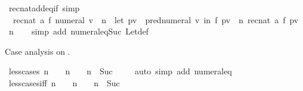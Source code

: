 \begin{isabellebody}
\ rec{\isacharunderscore}{\kern0pt}nat{\isacharunderscore}{\kern0pt}add{\isacharunderscore}{\kern0pt}eq{\isacharunderscore}{\kern0pt}if\ {\isacharbrackleft}{\kern0pt}simp{\isacharbrackright}{\kern0pt}{\isacharcolon}{\kern0pt}\isanewline
\ \ {\isachardoublequoteopen}rec{\isacharunderscore}{\kern0pt}nat\ a\ f\ {\isacharparenleft}{\kern0pt}numeral\ v\ {\isacharplus}{\kern0pt}\ n{\isacharparenright}{\kern0pt}\ {\isacharequal}{\kern0pt}\ {\isacharparenleft}{\kern0pt}let\ pv\ {\isacharequal}{\kern0pt}\ pred{\isacharunderscore}{\kern0pt}numeral\ v\ in\ f\ {\isacharparenleft}{\kern0pt}pv\ {\isacharplus}{\kern0pt}\ n{\isacharparenright}{\kern0pt}\ {\isacharparenleft}{\kern0pt}rec{\isacharunderscore}{\kern0pt}nat\ a\ f\ {\isacharparenleft}{\kern0pt}pv\ {\isacharplus}{\kern0pt}\ n{\isacharparenright}{\kern0pt}{\isacharparenright}{\kern0pt}{\isacharparenright}{\kern0pt}{\isachardoublequoteclose}\isanewline
%
\isadelimproof
\ \ %
\endisadelimproof
%
\isatagproof
{}\isamarkupfalse%
\ {\isacharparenleft}{\kern0pt}simp\ add{\isacharcolon}{\kern0pt}\ numeral{\isacharunderscore}{\kern0pt}eq{\isacharunderscore}{\kern0pt}Suc\ Let{\isacharunderscore}{\kern0pt}def{\isacharparenright}{\kern0pt}%
\endisatagproof
{\isafoldproof}%
%
\isadelimproof
%
\endisadelimproof
%
\begin{isamarkuptext}%
Case analysis on .%
\end{isamarkuptext}\isamarkuptrue%
\isamarkupfalse%
\ less{\isacharunderscore}{\kern0pt}{}{\isacharunderscore}{\kern0pt}cases{\isacharcolon}{\kern0pt}\ {\isachardoublequoteopen}n\ {\isacharless}{\kern0pt}\ {}\ {\isasymLongrightarrow}\ n\ {\isacharequal}{\kern0pt}\ {}\ {\isasymor}\ n\ {\isacharequal}{\kern0pt}\ Suc\ {}{\isachardoublequoteclose}\isanewline
%
\isadelimproof
\ \ %
\endisadelimproof
%
\isatagproof
{}\isamarkupfalse%
\ {\isacharparenleft}{\kern0pt}auto\ simp\ add{\isacharcolon}{\kern0pt}\ numeral{\isacharunderscore}{\kern0pt}{}{\isacharunderscore}{\kern0pt}eq{\isacharunderscore}{\kern0pt}{}{\isacharparenright}{\kern0pt}%
\endisatagproof
{\isafoldproof}%
%
\isadelimproof
\isanewline
%
\endisadelimproof
\isanewline
{}\isamarkupfalse%
\ less{\isacharunderscore}{\kern0pt}{}{\isacharunderscore}{\kern0pt}cases{\isacharunderscore}{\kern0pt}iff{\isacharcolon}{\kern0pt}\ {\isachardoublequoteopen}n\ {\isacharless}{\kern0pt}\ {}\ {\isasymlongleftrightarrow}\ n\ {\isacharequal}{\kern0pt}\ {}\ {\isasymor}\ n\ {\isacharequal}{\kern0pt}\ Suc\ {}{\isachardoublequoteclose}\isanewline

\end{isabellebody}
